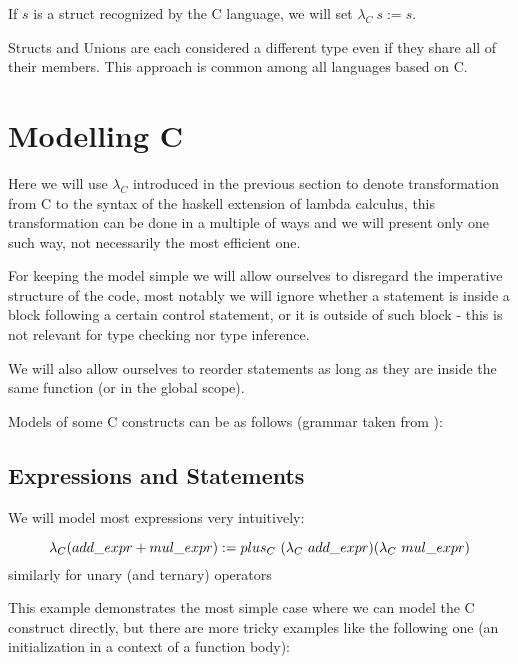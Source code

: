 \begin{defn}
	If $s$ is a struct recognized by the C language, we will set $\lambda_C\ s := s$.
\end{defn}

Structs and Unions are each considered a different type even if they share all of their members. This approach is common among all languages based on C.

\section{Modelling C}

Here we will use $\lambda_C$ introduced in the previous section to denote transformation from C to the syntax of the haskell extension of lambda calculus, this transformation can be done in a multiple of ways and we will present only one such way, not necessarily the most efficient one.

For keeping the model simple we will allow ourselves to disregard the imperative structure of the code, most notably we will ignore whether a statement is inside a block following a certain control statement, or it is outside of such block - this is not relevant for type checking nor type inference.

We will also allow ourselves to reorder statements as long as they are inside the same function (or in the global scope).

Models of some C constructs can be as follows (grammar taken from ): %

\subsection{Expressions and Statements}

We will model most expressions very intuitively:

\begin{defn}
	$$\lambda_C(add\_expr + mul\_expr) :=\\ plus_C\ (\lambda_C\ add\_expr) (\lambda_C\ mul\_expr)$$
	similarly for unary (and ternary) operators
\end{defn}


This example demonstrates the most simple case where we can model the C construct directly, but there are more tricky examples like the following one (an initialization in a context of a function body):

